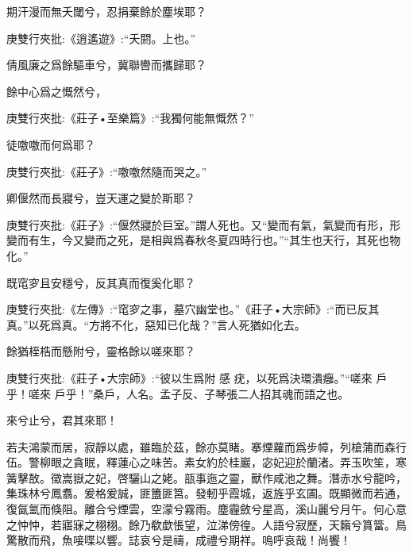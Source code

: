 \begin{qute2sp}
\begin{poem}
        \begin{pl}期汗漫而無夭閾兮，忍捐棄餘於塵埃耶？\end{pl}
        \begin{note}庚雙行夾批:《逍遙遊》:“夭閼。上也。”\end{note}

        \begin{pl}倩風廉之爲餘驅車兮，冀聯轡而攜歸耶？\end{pl}

        \begin{pl}餘中心爲之慨然兮，\end{pl}
        \begin{note}庚雙行夾批:《莊子•至樂篇》:“我獨何能無慨然？”\end{note}徒噭噭而何爲耶？
        \begin{note}庚雙行夾批:《莊子》:“噭噭然隨而哭之。”\end{note}

        \begin{pl}卿偃然而長寢兮，豈天運之變於斯耶？\end{pl}
        \begin{note}庚雙行夾批:《莊子》:“偃然寢於巨室。”謂人死也。又“變而有氣，氣變而有形，形變而有生，今又變而之死，是相與爲春秋冬夏四時行也。”“其生也天行，其死也物化。”\end{note}

        \begin{pl}既窀穸且安穩兮，反其真而復奚化耶？\end{pl}
        \begin{note}庚雙行夾批:《左傳》:“窀穸之事，墓穴幽堂也。”《莊子•大宗師》:“而已反其真。”以死爲真。“方將不化，惡知已化哉？”言人死猶如化去。\end{note}

        \begin{pl}餘猶桎梏而懸附兮，靈格餘以嗟來耶？\end{pl}
        \begin{note}庚雙行夾批:《莊子•大宗師》:“彼以生爲附 感 疣，以死爲決環潰癰。”“嗟來 戶乎！嗟來 戶乎！”桑戶，人名。孟子反、子琴張二人招其魂而語之也。\end{note}

        \begin{pl}來兮止兮，君其來耶！\end{pl}
    \end{poem}

    \begin{parag}
        若夫鴻蒙而居，寂靜以處，雖臨於茲，餘亦莫睹。搴煙蘿而爲步幛，列槍蒲而森行伍。警柳眼之貪眠，釋蓮心之味苦。素女約於桂巖，宓妃迎於蘭渚。弄玉吹笙，寒簧擊敔。徵嵩嶽之妃，啓驪山之姥。瓿事迤之靈，獸作咸池之舞。潛赤水兮龍吟，集珠林兮鳳翥。爰格爰誠，匪簠匪筥。發軔乎霞城，返旌乎玄圃。既顯微而若通，復氤氳而倏阻。離合兮煙雲，空濛兮霧雨。塵霾斂兮星高，溪山麗兮月午。何心意之忡忡，若寤寐之栩栩。餘乃欷歔悵望，泣涕傍徨。人語兮寂歷，天籟兮篔簹。鳥驚散而飛，魚唼喋以響。誌哀兮是禱，成禮兮期祥。嗚呼哀哉！尚饗！
    \end{parag}

\end{qute2sp}

